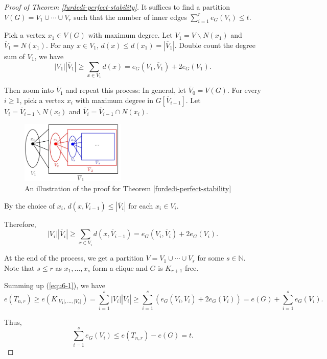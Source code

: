 \documentclass{article}
\theoremstyle{definition}
\begin{document}
\begin{proof}[Proof of Theorem \ref{furdedi-perfect-stability}]{}{}
    It suffices to find a partition $V(G)=V_1\cup \cdots \cup V_r$ such that the number of inner edges $\sum\limits_{i=1}^{r} e_{G}(V_i)\leq t$.

    Pick a vertex $x_1\in V(G)$ with maximum degree. Let $V_1 = V \backslash N(x_1)$ and $\overline{V}_1= N(x_1)$. 
    For any $x \in V_1$, $d(x) \leq d(x_1) = |\overline{V}_1|$. Double count the degree sum of $V_1$, we have 
    \begin{equation*}
    |V_1||\overline{V}_1|\geq \sum\limits_{x\in V_1} d(x) = e_{G}(V_1,\overline{V}_1) +2 e_{G}(V_1).
    \end{equation*}

    Then zoom into $\overline{V}_1$ and repeat this process: In general, let $\overline{V}_0=V(G)$. For every $i \geq 1$, pick a vertex $x_i$ with maximum degree in $G[\overline{V}_{i-1}]$. Let $V_i=\overline{V}_{i-1}\backslash N(x_i)$ and $\overline{V}_i=\overline{V}_{i-1}\cap N(x_i)$.
    \begin{figure}[htbp]
        \centering
        \includegraphics[width=5cm]{6-2.png}
        \caption{An illustration of the proof for Theorem \ref{furdedi-perfect-stability}}
        \label{fig:6-2}
    \end{figure}

     By the choice of $x_i$, $d(x,\overline{V}_{i-1})\leq |\overline{V}_i|$ for each $x_i \in V_i$.

     Therefore, \begin{equation}\label{equ6-1}
         |V_i||\overline{V}_i|\geq \sum\limits_{x\in V_i} d(x,\overline{V}_{i-1}) = e_G(V_i,\overline{V}_i) +2 e_G(V_i).
     \end{equation}

     At the end of the process, we get a partition $V=V_1\cup \cdots \cup V_s$ for some $s \in \mathbb{N}$. Note that $s\leq r$ as $x_1,\dots,x_s$ form a clique and $G$ is $K_{r+1}$-free. 

     Summing up (\ref{equ6-1}), we have
     \begin{equation*}
         e(T_{n,r})\geq e(K_{|V_1|,\ldots,|V_s|})=\sum\limits_{i=1}^{s} |V_i||\overline{V}_i|\geq \sum\limits_{i=1}^{s} (e_G(V_i,\overline{V}_i) +2 e_G(V_i))=e(G)+\sum\limits_{i=1}^{s} e_G(V_i).
     \end{equation*}

     Thus, \begin{equation*}
         \sum\limits_{i=1}^{s} e_G(V_i)\leq e(T_{n,r})-e(G)=t.
     \end{equation*}
\end{proof}
\end{document}
